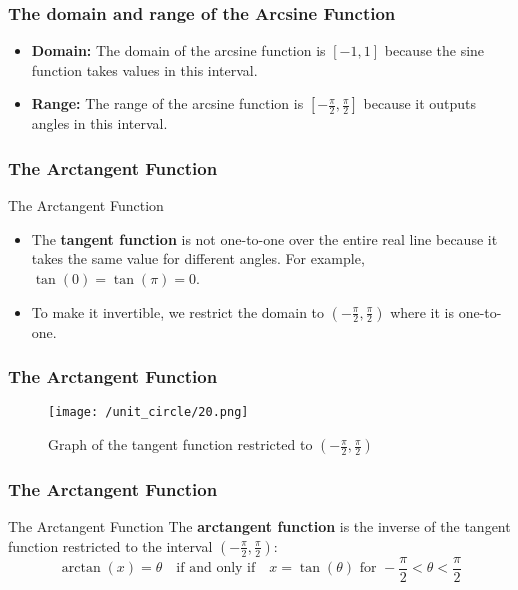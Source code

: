\begin{frame}
    \frametitle{The domain and range of the Arcsine Function}
    \begin{itemize}
        \item \textbf{Domain:} The domain of the arcsine function is \([-1, 1]\) because the sine function takes values in this interval.
        \item \textbf{Range:} The range of the arcsine function is \([- \frac{\pi}{2}, \frac{\pi}{2}]\) because it outputs angles in this interval.
    \end{itemize}       
\end{frame}


    \begin{frame}
    \frametitle{The Arctangent Function}
    \begin{block}{The Arctangent Function}
    \begin{itemize}
        \item The \textbf{tangent function} is not one-to-one over the entire real line because it takes the same value for different angles. For example, \(\tan(0) = \tan(\pi) = 0\).
        \item To make it invertible, we restrict the domain to \((- \frac{\pi}{2}, \frac{\pi}{2})\) where it is one-to-one.
    \end{itemize}
    \end{block}
\end{frame}

\begin{frame}
    \frametitle{The Arctangent Function}
    \begin{figure}
        \centering
        \texttt{[image: /unit\_circle/20.png]}
        \caption{Graph of the tangent function restricted to \((- \frac{\pi}{2}, \frac{\pi}{2})\)}
    \end{figure}
\end{frame}

\begin{frame}
    \frametitle{The Arctangent Function}
    \begin{block}{The Arctangent Function}
        The \textbf{arctangent function} is the inverse of the tangent function restricted to the interval \((- \frac{\pi}{2}, \frac{\pi}{2})\):
        \[
        \arctan(x) = \theta \quad \text{if and only if} \quad x = \tan(\theta) \text{ for } -\frac{\pi}{2} < \theta < \frac{\pi}{2}
        \]
    \end{block}
\end{frame}

